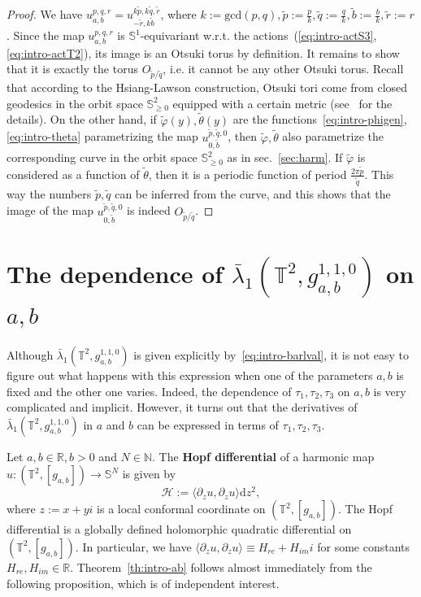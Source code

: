 \documentclass{amsart}
\let\ge\geqslant
\let\phi\varphi
\renewcommand{\d}{\mathrm{d}}
\theoremstyle{plain}
\theoremstyle{definition}
\theoremstyle{remark}
\begin{document}
\begin{proof}
We have \(u_{a,b}^{p,q,r}=u_{-\tilde r,k\tilde b}^{k\tilde p,k\tilde q,\tilde
r}\), where \(k:=\mathrm{gcd}(p,q),\tilde p:=\frac{p}k,\tilde
q:=\frac{q}k,\tilde b:=\frac{b}k,\tilde r:=r\).
Since the map \(u_{a,b}^{p,q,r}\) is \(\mathbb S^1\)-equivariant
w.r.t. the actions~(\ref{eq:intro-actS3},\ref{eq:intro-actT2}), its image is an
Otsuki torus by definition. It remains to show that it is exactly the torus
\(O_{\tilde p/\tilde q}\), i.e. it cannot be any other Otsuki torus. Recall that
according to the Hsiang-Lawson construction, Otsuki tori come from closed
geodesics in the orbit space \(\mathbb S_{\ge 0}^2\) equipped with a certain
metric (see~\cite{HL1971,Pen2013b} for the details). On the other hand, if
\(\tilde\phi(y),\tilde\theta(y)\) are the
functions~\eqref{eq:intro-phigen},\eqref{eq:intro-theta} parametrizing the map
\(u_{0,\tilde b}^{\tilde p,\tilde q,0}\), then \(\tilde\phi,\tilde\theta\) also
parametrize the corresponding curve in the orbit space \(\mathbb S_{\ge 0}^2\)
as in sec.~\ref{sec:harm}. If \(\tilde\phi\) is considered as a function of
\(\tilde\theta\), then it is a periodic function of period \(\frac{2\pi\tilde
p}{\tilde q}\). This way the numbers \(\tilde p,\tilde q\) can be inferred from
the curve, and this shows that the image of the map \(u_{0,\tilde b}^{\tilde
p,\tilde q,0}\) is indeed \(O_{\tilde p/\tilde q}\).
\end{proof}

\section{The dependence of \texorpdfstring{\(\bar\lambda_1(\mathbb
T^2,g_{a,b}^{1,1,0})\)}{λ̄₁} on \texorpdfstring{\(a,b\)}{a, b}}
\label{sec:ab}

Although \(\bar\lambda_1(\mathbb T^2,g_{a,b}^{1,1,0})\) is given explicitly
by~\eqref{eq:intro-barlval}, it is not easy to figure out what happens with this
expression when one of the parameters \(a,b\) is fixed and the other one varies.
Indeed, the dependence of \(\tau_1,\tau_2,\tau_3\) on \(a,b\) is very
complicated and implicit. However, it turns out that the derivatives of
\(\bar\lambda_1(\mathbb T^2,g_{a,b}^{1,1,0})\) in \(a\) and \(b\) can be
expressed in terms of \(\tau_1,\tau_2,\tau_3\).

Let \(a,b\in\mathbb R,b>0\) and \(N\in\mathbb N\). The
\textbf{Hopf differential} of a harmonic map \(u\colon (\mathbb
T^2,[g_{a,b}])\to\mathbb S^N\) is given by
\[
\mathcal H:=\langle\partial_z u,\partial_z u\rangle\d z^2,
\]
where \(z:=x+yi\) is a local conformal coordinate on \((\mathbb
T^2,[g_{a,b}])\). The Hopf differential is a globally defined holomorphic
quadratic differential on \((\mathbb T^2,[g_{a,b}])\). In particular, we have
\(\langle\partial_z u,\partial_z u\rangle\equiv H_{re}+H_{im}i\) for some
constants \(H_{re},H_{im}\in\mathbb R\). Theorem~\ref{th:intro-ab} follows
almost immediately from the following proposition, which is of independent
interest.
\end{document}
